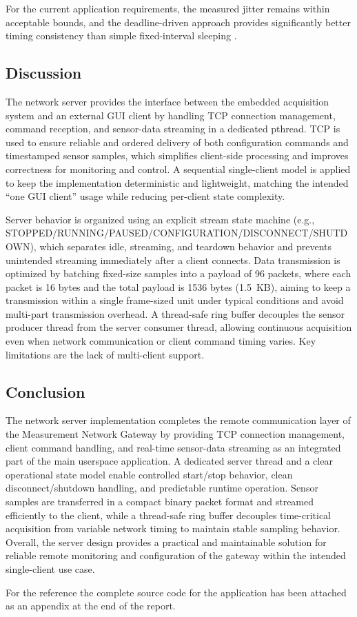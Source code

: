For the current application requirements, the measured jitter remains within acceptable bounds, and the deadline-driven approach provides significantly better timing consistency than simple fixed-interval sleeping \cite{realtime, ring_buffer_basics}.

\subsection{Discussion}
The network server provides the interface between the embedded acquisition system and an external GUI client by handling TCP connection management, command reception, and sensor-data streaming in a dedicated pthread. TCP is used to ensure reliable and ordered delivery of both configuration commands and timestamped sensor samples, which simplifies client-side processing and improves correctness for monitoring and control. A sequential single-client model is applied to keep the implementation deterministic and lightweight, matching the intended ``one GUI client'' usage while reducing per-client state complexity.

Server behavior is organized using an explicit stream state machine (e.g., STOPPED/RUNNING/PAUSED/CONFIGURATION/DISCONNECT/SHUTDOWN), which separates idle, streaming, and teardown behavior and prevents unintended streaming immediately after a client connects. Data transmission is optimized by batching fixed-size samples into a payload of 96 packets, where each packet is 16 bytes and the total payload is 1536 bytes (1.5~KB), aiming to keep a transmission within a single frame-sized unit under typical conditions and avoid multi-part transmission overhead. A thread-safe ring buffer decouples the sensor producer thread from the server consumer thread, allowing continuous acquisition even when network communication or client command timing varies. Key limitations are the lack of multi-client support. 


\subsection{Conclusion}
The network server implementation completes the remote communication layer of the Measurement Network Gateway by providing TCP connection management, client command handling, and real-time sensor-data streaming as an integrated part of the main userspace application. A dedicated server thread and a clear operational state model enable controlled start/stop behavior, clean disconnect/shutdown handling, and predictable runtime operation. Sensor samples are transferred in a compact binary packet format and streamed efficiently to the client, while a thread-safe ring buffer decouples time-critical acquisition from variable network timing to maintain stable sampling behavior. Overall, the server design provides a practical and maintainable solution for reliable remote monitoring and configuration of the gateway within the intended single-client use case.

For the reference the complete source code for the application has been attached as an appendix at the end of the report. 


